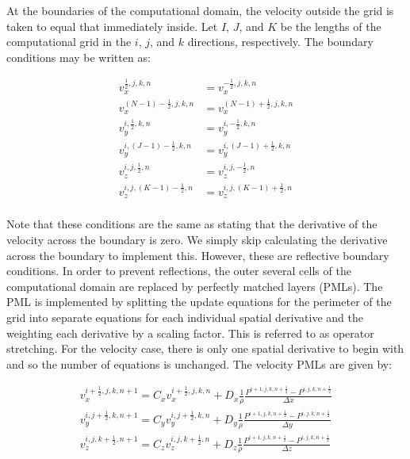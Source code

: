At the boundaries of the computational domain, the velocity outside the grid is
taken to equal that immediately inside. Let $I$, $J$, and $K$ be the lengths of
the computational grid in the $i$, $j$, and $k$ directions, respectively. The
boundary conditions may be written as: 

\begin{align*}
    v_x^{\frac{1}{2},j,k,n} &= v_x^{-\frac{1}{2},j,k,n} \\
    v_x^{(N-1)-\frac{1}{2},j,k,n} &= v_x^{(N-1)+\frac{1}{2},j,k,n} \\
    v_y^{i,\frac{1}{2},k,n} &= v_y^{i,-\frac{1}{2},k,n} \\
    v_y^{i,(J-1)-\frac{1}{2},k,n} &= v_y^{i,(J-1)+\frac{1}{2},k,n} \\
    v_z^{i,j,\frac{1}{2},n} &= v_z^{i,j,-\frac{1}{2},n} \\
    v_z^{i,j,(K-1)-\frac{1}{2},n} &= v_z^{i,j,(K-1)+\frac{1}{2},n} \\
\end{align*}

Note that these conditions are the same as stating that the derivative of the
velocity across the boundary is zero. We simply skip calculating the derivative
across the boundary to implement this. However, these are reflective boundary
conditions. In order to prevent reflections, the outer several cells of the
computational domain are replaced by perfectly matched layers (PMLs). The PML
is implemented by splitting the update equations for the perimeter of the grid
into separate equations for each individual spatial derivative and the
weighting each derivative by a scaling factor. This is referred to as operator
stretching. For the velocity case, there is only one spatial derivative to
begin with and so the 
number of equations is unchanged. The velocity PMLs are given by:

\begin{gather*}
    v_x^{i+\frac{1}{2},j,k,n+1} = C_x v_x^{i+\frac{1}{2},j,k,n} + 
                                  D_x \frac{1}{\rho}\frac{P^{i+1,j,k,n+\frac{1}{2}}-P^{i,j,k,n+\frac{1}{2}}}{\Delta x}\\
    v_y^{i,j+\frac{1}{2},k,n+1} = C_y v_y^{i,j+\frac{1}{2},k,n} + 
                                  D_y \frac{1}{\rho}\frac{P^{i+1,j,k,n+\frac{1}{2}}-P^{i,j,k,n+\frac{1}{2}}}{\Delta y}\\
    v_z^{i,j,k+\frac{1}{2},n+1} = C_z v_z^{i,j,k+\frac{1}{2},n} + 
                                  D_z \frac{1}{\rho}\frac{P^{i+1,j,k,n+\frac{1}{2}}-P^{i,j,k,n+\frac{1}{2}}}{\Delta z}\\
\end{gather*}

